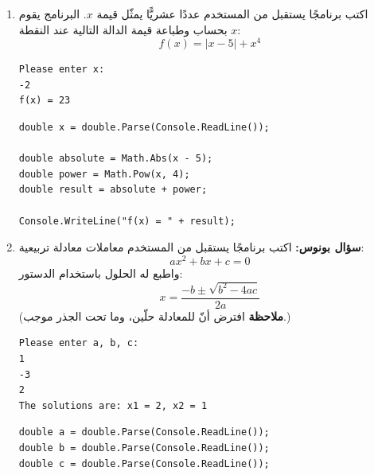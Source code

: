 \documentclass[14pt]{extarticle}
\begin{document}
\begin{enumerate}[itemsep=3em]
\begin{boxSolution}
\begin{english}
\begin{verbatim}
double maxAB = Math.Max(a, b);
double hypotenuse = Math.Max(maxAB, c);

// The product of the two legs is (a * b * c) / hypotenuse
double productOfLegs = (a * b * c) / hypotenuse;
double area = productOfLegs / 2.0;

Console.WriteLine("Area = " + area);
    \end{verbatim}
    \end{english}
    \end{boxSolution}
    \fi
    \fi
    \clearpage

    \item
    اكتب برنامجًا يستقبل من المستخدم عددًا عشريًّا يمثّل قيمة $x$.
    البرنامج يقوم بحساب وطباعة قيمة الدالة التالية عند النقطة $x$:
    $$ f(x) = |x - 5| + x^4 $$
    \ifdetailed
    \begin{boxExample}
    \begin{english}
    \begin{verbatim}
Please enter x:
-2
f(x) = 23
    \end{verbatim}
    \end{english}
    \end{boxExample}
    \ifwithsols
    \begin{boxSolution}
    \begin{english}
    \begin{verbatim}
double x = double.Parse(Console.ReadLine());

double absolute = Math.Abs(x - 5);
double power = Math.Pow(x, 4);
double result = absolute + power;

Console.WriteLine("f(x) = " + result);
    \end{verbatim}
    \end{english}
    \end{boxSolution}
    \clearpage
    \fi
    \fi

    \item \textbf{سؤال بونوس:}
    اكتب برنامجًا يستقبل من المستخدم معاملات معادلة تربيعية:
    \[
        ax^2 + bx + c = 0
    \]
    واطبع له الحلول باستخدام الدستور:
    \[
        x = \frac{-b \pm \sqrt{b^2 - 4ac}}{2a}
    \]
    (\textbf{ملاحظة} افترض أنّ للمعادلة حلّين، وما تحت الجذر موجب.)
    \ifdetailed
    \begin{boxExample}
        \begin{english}
            \begin{verbatim}
Please enter a, b, c:
1
-3
2
The solutions are: x1 = 2, x2 = 1
\end{verbatim}
\end{english}
\end{boxExample}
\ifwithsols
\begin{boxSolution}
    \begin{english}
    \begin{verbatim}
double a = double.Parse(Console.ReadLine());
double b = double.Parse(Console.ReadLine());
double c = double.Parse(Console.ReadLine());


\end{verbatim}
\end{english}
\end{boxSolution}
\end{enumerate}
\end{document}
